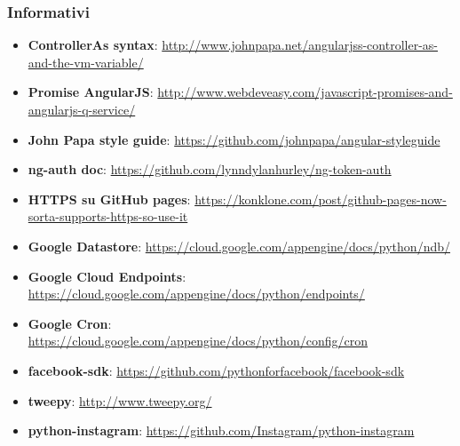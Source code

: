 		\subsubsection{Informativi} %
		\label{ssub:informativi}
			\begin{itemize}
				\item \textbf{ControllerAs syntax}: \newline	\url{http://www.johnpapa.net/angularjss-controller-as-and-the-vm-variable/}
				\item \textbf{Promise AngularJS}: \newline
\url{http://www.webdeveasy.com/javascript-promises-and-angularjs-q-service/}
				\item \textbf{John Papa style guide}: \url{https://github.com/johnpapa/angular-styleguide}
				\item \textbf{ng-auth doc}: \url{https://github.com/lynndylanhurley/ng-token-auth}
				\item \textbf{HTTPS su GitHub pages}: \url{https://konklone.com/post/github-pages-now-sorta-supports-https-so-use-it}
				\item \textbf{Google Datastore}: \url{https://cloud.google.com/appengine/docs/python/ndb/}
				\item \textbf{Google Cloud Endpoints}: \url{https://cloud.google.com/appengine/docs/python/endpoints/}
				\item \textbf{Google Cron}: \url{https://cloud.google.com/appengine/docs/python/config/cron}
				\item \textbf{facebook-sdk}: \url{https://github.com/pythonforfacebook/facebook-sdk}
				\item \textbf{tweepy}: \url{http://www.tweepy.org/}
				\item \textbf{python-instagram}: \url{https://github.com/Instagram/python-instagram}
			\end{itemize}
